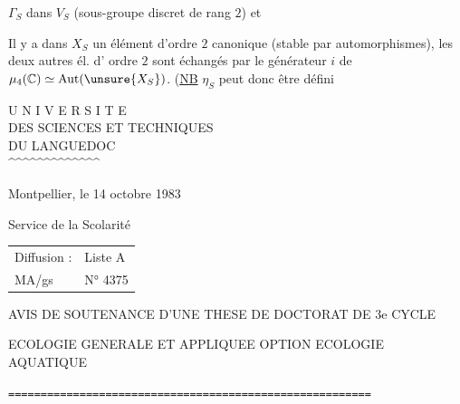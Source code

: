 $\Gamma_S$ dans $V_S$ (sous-groupe discret de
rang $2$) et

Il y a dans $X_S$ un élément d'ordre $2$ canonique
(stable par automorphismes), les deux autres él. d'
ordre $2$ sont échangés par le générateur $i$ de
$\mu_4(\mathbb C)\simeq\operatorname{Aut}(\unsure{X_S})$.
(\uline{NB} $\eta_S$ peut donc être défini



\noindent
\begin{minipage}[t]{.46\textwidth}
\begin{center}
U N I V E R S I T E\\
DES SCIENCES ET TECHNIQUES\\
DU LANGUEDOC\\
\textasciicircum\textasciicircum\textasciicircum\textasciicircum\textasciicircum\textasciicircum\textasciicircum\textasciicircum\textasciicircum\textasciicircum\textasciicircum\textasciicircum\textasciicircum
\end{center}
\end{minipage}\hfill
\begin{minipage}[t]{.50\textwidth}
\vspace{.9\baselineskip}
Montpellier, le 14 octobre 1983
\end{minipage}

Service de la Scolarité

\begin{tabular}{@{}ll@{}}
Diffusion : & Liste A\\
MA/gs & N° 4375
\end{tabular}

\begin{center}
AVIS DE SOUTENANCE D'UNE THESE DE DOCTORAT DE 3e CYCLE

ECOLOGIE GENERALE ET APPLIQUEE OPTION ECOLOGIE AQUATIQUE

\texttt{========================================================}
\end{center}

